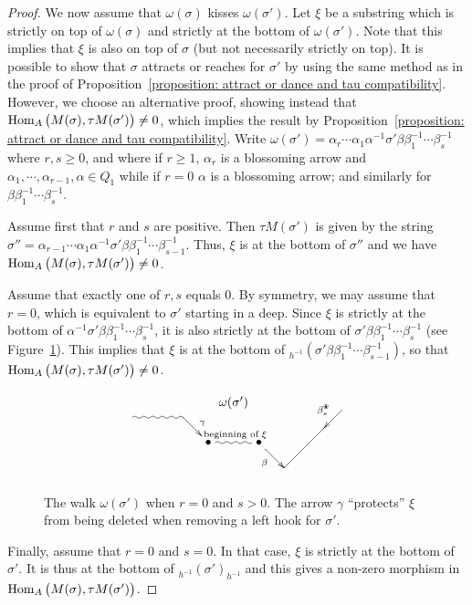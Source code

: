 \documentclass{memo-l}
\theoremstyle{definition}
\newcommand{\blossom}{^\text{\ding{96}}} %
\newcommand{\Hom}[1]{\operatorname{{\rm Hom}}_{#1}}
\begin{document}
\begin{proof}
We now assume that $\omega(\sigma)$ kisses $\omega(\sigma')$.
Let $\xi$ be a substring which is strictly on top of $\omega(\sigma)$ and strictly at the bottom of $\omega(\sigma')$.
Note that this implies that $\xi$ is also on top of $\sigma$ (but not necessarily strictly on top).
It is possible to show that $\sigma$ attracts or reaches for $\sigma'$ by using the same method as in the proof of Proposition~\ref{proposition: attract or dance and tau compatibility}.
However, we choose an alternative proof, showing instead that $\Hom{A} \big( M(\sigma), \tau M(\sigma') \big) \ne 0$, which implies the result by Proposition~\ref{proposition: attract or dance and tau compatibility}. 
Write $\omega(\sigma')=\alpha_r \cdots \alpha_1 \alpha^{-1} \sigma' \beta \beta_1^{-1} \cdots \beta_s^{-1}$ where $r,s\geq 0$, and where if $r\geq 1$, $\alpha_r$ is a blossoming arrow and $\alpha_1,\cdots,\alpha_{r-1},\alpha\in Q_1$ while if $r=0$ $\alpha$ is a blossoming arrow; and similarly for $\beta\beta_1^{-1}\cdots\beta_s^{-1}$.

Assume first that $r$ and $s$ are positive.
Then $\tau M(\sigma')$ is given by the string $\sigma''=\alpha_{r-1} \cdots \alpha_1 \alpha^{-1} \sigma' \beta \beta_1^{-1} \cdots \beta_{s-1}^{-1}$.
Thus, $\xi$ is at the bottom of $\sigma''$ and we have $\Hom{A} \big( M(\sigma), \tau M(\sigma') \big) \neq 0$.

Assume that exactly one of $r,s$ equals $0$.
By symmetry, we may assume that $r=0$, which is equivalent to $\sigma'$ starting in a deep.
Since $\xi$ is strictly at the bottom of $\alpha^{-1}\sigma'\beta\beta_1^{-1}\cdots\beta_s^{-1}$, it is also strictly at the bottom of $\sigma'\beta\beta_1^{-1}\cdots\beta_s^{-1}$ (see Figure~\ref{fig: r=0}).
This implies that $\xi$ is at the bottom of $_{h^{-1}}(\sigma'\beta\beta_1^{-1}\cdots\beta_{s-1}^{-1})$, so that $\Hom{A} \big( M(\sigma), \tau M(\sigma') \big) \ne 0$.

\begin{figure}[h]
 	\capstart
\[
\xy
%
(-33,16)="-14";
(-28,21)="-13";
(-14,21)="-12";
(-7,14)*+{\bullet}="-11";
(0,25)*+{\omega(\sigma')};
(7,14)*+{\bullet}="11";
(14,7)="12";
(25,18)="13";
(30,23)="14";
%
{\ar@{~} "-13";"-12"};
{\ar^{\gamma} "-12";"-11"};
{\ar@{~}^{\text{ beginning of }\xi} "-11";"11"};
{\ar_\beta "11";"12"};
{\ar@{-} "12";"13"};
{\ar_{\beta_s\blossom} "14";"13"};
%
\endxy
\]
    \caption{The walk $\omega(\sigma')$ when $r=0$ and $s>0$. The arrow $\gamma$ ``protects'' $\xi$ from being deleted when removing a left hook for $\sigma'$.}
    \label{fig: r=0}
\end{figure}

Finally, assume that $r=0$ and $s=0$.
In that case, $\xi$ is strictly at the bottom of $\sigma'$.
It is thus at the bottom of $_{h^{-1}}(\sigma')_{h^{-1}}$ and this gives a non-zero morphism in $\Hom{A} \big( M(\sigma), \tau M(\sigma') \big)$.
\end{proof}
\end{document}
